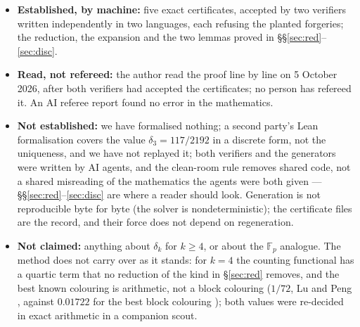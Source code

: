 \documentclass[11pt]{article}
\begin{document}
\begin{itemize}
\item \textbf{Established, by machine:} five exact certificates, accepted by two verifiers written independently in two languages, each refusing the planted forgeries; the reduction, the expansion and the two lemmas proved in \S\S\ref{sec:red}--\ref{sec:disc}.
\item \textbf{Read, not refereed:} the author read the proof line by line on 5 October 2026, after both verifiers had accepted the certificates; no person has refereed it. An AI referee report \cite{EPAD} found no error in the mathematics.
\item \textbf{Not established:} we have formalised nothing; a second party's Lean formalisation \cite{Sn} covers the value $\delta_3=117/2192$ in a discrete form, not the uniqueness, and we have not replayed it; both verifiers and the generators were written by AI agents, and the clean-room rule removes shared code, not a shared misreading of the mathematics the agents were both given --- \S\S\ref{sec:red}--\ref{sec:disc} are where a reader should look. Generation is not reproducible byte for byte (the solver is nondeterministic); the certificate files are the record, and their force does not depend on regeneration.
\item \textbf{Not claimed:} anything about $\delta_k$ for $k\ge4$, or about the $\mathbb{F}_p$ analogue. The method does not carry over as it stands: for $k=4$ the counting functional has a quartic term that no reduction of the kind in \S\ref{sec:red} removes, and the best known colouring is arithmetic, not a block colouring ($1/72$, Lu and Peng \cite{LP}, against $0.01722$ for the best block colouring \cite{BCG}); both values were re-decided in exact arithmetic in a companion scout.
\end{itemize}

\end{document}
